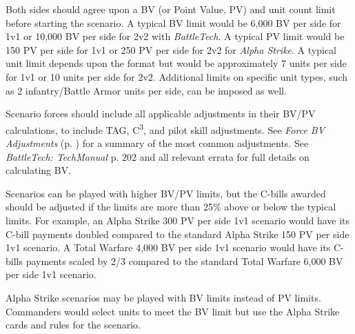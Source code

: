 Both sides should agree upon a BV (or Point Value, PV) and unit count limit before starting the scenario.
A typical BV limit would be 6,000 BV per side for 1v1 or 10,000 BV per side for 2v2 with \emph{BattleTech}.
A typical PV limit would be 150 PV per side for 1v1 or 250 PV per side for 2v2 for \emph{Alpha Strike}.
A typical unit limit depends upon the format but would be approximately 7 units per side for 1v1 or 10 units per side for 2v2.
Additional limits on specific unit types, such as 2 infantry/Battle Armor units per side, can be imposed as well.

Scenario forces should include all applicable adjustments in their BV/PV calculations, to include TAG, C\textsuperscript{3}, and pilot skill adjustments.
See \emph{Force BV Adjustments} (p. \pageref{sec:force_bv_adjustments}) for a summary of the most common adjustments.
See \emph{BattleTech: TechManual} p. 202 and all relevant errata for full details on calculating BV.

Scenarios can be played with higher BV/PV limits, but the C-bills awarded should be adjusted if the limits are more than 25\% above or below the typical limits.
For example, an Alpha Strike 300 PV per side 1v1 scenario would have its C-bill payments doubled compared to the standard Alpha Strike 150 PV per side 1v1 scenario.
A Total Warfare 4,000 BV per side 1v1 scenario would have its C-bills payments scaled by 2/3 compared to the standard Total Warfare 6,000 BV per side 1v1 scenario.

Alpha Strike scenarios may be played with BV limits instead of PV limits.
Commanders would select units to meet the BV limit but use the Alpha Strike cards and rules for the scenario.
